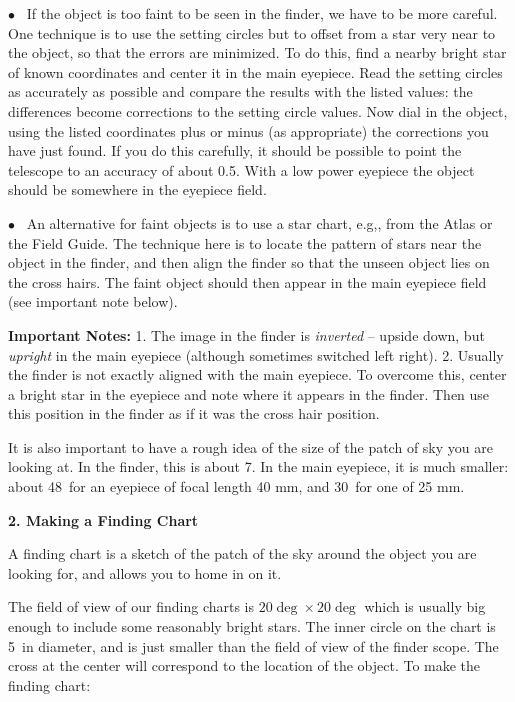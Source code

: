 \documentclass[12pt]{article}
\begin{document}
\medskip\noindent  $\bullet$ \ If the object is too faint to be seen
in the finder, we have to be more careful. One technique is to use the
setting circles but to offset from a star very near to the object, so
that the errors are minimized. To do this, find a nearby bright star of
known coordinates and center it in the main eyepiece. Read the setting
circles as accurately as possible and compare the results with the
listed values: the differences become corrections to the setting circle
values. Now dial in the object, using the listed coordinates plus or
minus (as appropriate) the corrections you have just found. If you do
this carefully, it should be possible to point the telescope to an
accuracy of about 0.5\deg.  With a low power 
eyepiece the object should be somewhere in the eyepiece field.

\medskip\noindent  $\bullet$ \ An alternative for faint objects is to
use a star chart, e.g,, from the Atlas or the Field Guide. The
technique here is to locate the pattern of stars near the object in
the finder, and then align the finder so that the unseen object lies on the
cross hairs. The faint object should then appear in the main eyepiece
field (see important
note below).


\medskip\noindent
{\bf Important Notes:}  1. The image in the finder is
\emph{inverted} -- upside down, but \emph{upright}
in the main eyepiece (although sometimes switched left right).
2. Usually the finder is not exactly aligned with the main
eyepiece. To overcome this, center a bright star in the eyepiece and
note where it appears in the finder. Then use this position in the
finder as if it was the cross hair position.


It is also important to have a rough idea of the
size of the patch of sky you are looking at. In the finder, this is
about 7\deg. In the main eyepiece, it is much smaller: about 48\arcmin\ for
an eyepiece of focal length 40 mm, and 30\arcmin\ for one of 25 mm.


\newpage



\noindent
{\bf 2. Making a Finding Chart}

\medskip
\noindent
A finding chart is a sketch of the patch of the sky around the object
you are looking for, and allows you to home in on it.

The field of view of our finding charts is $20\deg \times 20 \deg$
which is usually big enough to include some reasonably
bright stars.  The inner circle on the chart is 5\deg\ in diameter,
and is just smaller than the field of view of the finder scope. The
cross at the center will correspond to the location of the object. To
make the finding chart:
\end{document}
